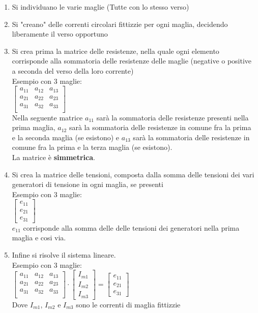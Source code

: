 \documentclass[../main.tex]{subfiles}
\begin{document}
	\begin{enumerate}
		\item Si individuano le varie maglie (Tutte con lo stesso verso)
		\item Si "creano" delle correnti circolari fittizzie per ogni maglia, decidendo liberamente il verso opportuno
		\item Si crea prima la matrice delle resistenze, nella quale ogni elemento corrisponde alla sommatoria delle resistenze delle maglie (negative o positive a seconda del verso della loro corrente)\\
		Esempio con 3 maglie: \\
		$\begin{bmatrix}
			a_{11} & a_{12} & a_{13}\\
			a_{21} & a_{22} & a_{23}\\
			a_{31} & a_{32} & a_{33}\\
		\end{bmatrix}$\\
		Nella seguente matrice $a_{11}$ sarà la sommatoria delle resistenze presenti nella prima maglia, $a_{12}$ sarà la sommatoria delle resistenze in comune fra la prima e la seconda maglia (se esistono) e $a_{13}$ sarà la sommatoria delle resistenze in comune fra la prima e la terza maglia (se esistono).\\
		La matrice è \textbf{simmetrica}.
		\item Si crea la matrice delle tensioni, composta dalla somma delle tensioni dei vari generatori di tensione in ogni maglia, se presenti\\
		Esempio con 3 maglie:\\
		$\begin{bmatrix}
			e_{11} \\
			e_{21} \\
			e_{31}
		\end{bmatrix}$\\
		$e_{11}$ corrisponde alla somma delle delle tensioni dei generatori nella prima maglia e cosi via.
		\item Infine si risolve il sistema lineare.\\
		Esempio con 3 maglie:\\
		$\begin{bmatrix}
			a_{11} & a_{12} & a_{13}\\
			a_{21} & a_{22} & a_{23}\\
			a_{31} & a_{32} & a_{33}\\
		\end{bmatrix}
		\cdot 
		\begin{bmatrix}
			I_{m1} \\
			I_{m2} \\
			I_{m3} 
		\end{bmatrix}
		=
		\begin{bmatrix}
			e_{11} \\
			e_{21} \\
			e_{31}
		\end{bmatrix}$\\
		Dove $I_{m1}$, $I_{m2}$ e $I_{m3}$ sono le correnti di maglia fittizzie
	\end{enumerate}
\end{document}
